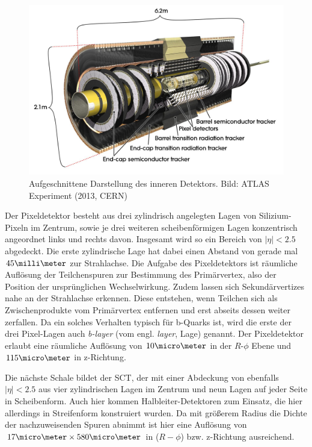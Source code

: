 \begin{figure}
    \centering
    \includegraphics[width=.8\textwidth]{img/inner_detector}
    \caption[Darstellung des inneren Detektors]
        {Aufgeschnittene Darstellung des inneren Detektors. Bild: ATLAS
        Experiment (2013, CERN)}
    \label{fig:inner_detector}
\end{figure}

Der Pixeldetektor besteht aus drei zylindrisch angelegten Lagen von
Silizium-Pixeln im Zentrum, sowie je drei weiteren scheibenförmigen Lagen
konzentrisch angeordnet links und rechts davon. Insgesamt wird so ein Bereich
von $|\eta| < 2.5$ abgedeckt. Die erste zylindrische Lage hat dabei einen
Abstand von gerade mal $45\milli\meter$ zur Strahlachse. Die Aufgabe des
Pixeldetektors ist räumliche Auflösung der Teilchenspuren zur Bestimmung des
Primärvertex, also der Position der ursprünglichen Wechselwirkung. Zudem lassen
sich Sekundärvertizes nahe an der Strahlachse erkennen. Diese entstehen, wenn
Teilchen sich als Zwischenprodukte vom Primärvertex entfernen und erst abseits
dessen weiter zerfallen. Da ein solches Verhalten typisch für b-Quarks ist,
wird die erste der drei Pixel-Lagen auch \textit{b-layer} (vom engl.
\textit{layer}, Lage) genannt. Der Pixeldetektor erlaubt eine räumliche
Auflösung von $10\micro\meter$ in der $R$-$\phi$ Ebene und $115\micro\meter$ in
z-Richtung.

Die nächste Schale bildet der \acf{SCT}, der mit einer Abdeckung von ebenfalls
$|\eta| < 2.5$ aus vier zylindrischen Lagen im Zentrum und neun Lagen auf jeder
Seite in Scheibenform. Auch hier kommen Halbleiter-Detektoren zum Einsatz, die
hier allerdings in Streifenform konstruiert wurden. Da mit größerem Radius die
Dichte der nachzuweisenden Spuren abnimmt ist hier eine Auflösung von
$17\micro\meter \times 580\micro\meter$ in ($R-\phi$) bzw. z-Richtung
ausreichend.

